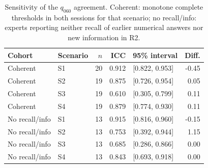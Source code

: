 \begin{table}[tb]
\centering
\caption{Sensitivity of the $q_{060}$ agreement. Coherent: monotone complete thresholds in both sessions for that scenario; no recall/info: experts reporting neither recall of earlier numerical answers nor new information in R2.}
\label{tab:reliability20-sensitivity}
\scriptsize\setlength{\tabcolsep}{3pt}
\begin{tabular}{@{}llrrlr@{}}
\toprule
Cohort & Scenario & $n$ & ICC & 95\% interval & Diff.\\\midrule
Coherent & S1 & 20 & 0.912 & [0.822, 0.953] & -0.45\\
Coherent & S2 & 19 & 0.875 & [0.726, 0.954] & 0.05\\
Coherent & S3 & 19 & 0.610 & [0.305, 0.799] & 0.11\\
Coherent & S4 & 19 & 0.879 & [0.774, 0.930] & 0.11\\
No recall/info & S1 & 13 & 0.915 & [0.816, 0.960] & -0.15\\
No recall/info & S2 & 13 & 0.753 & [0.392, 0.944] & 1.15\\
No recall/info & S3 & 13 & 0.685 & [0.286, 0.866] & 0.00\\
No recall/info & S4 & 13 & 0.843 & [0.693, 0.918] & 0.00\\
\bottomrule
\end{tabular}
\end{table}
